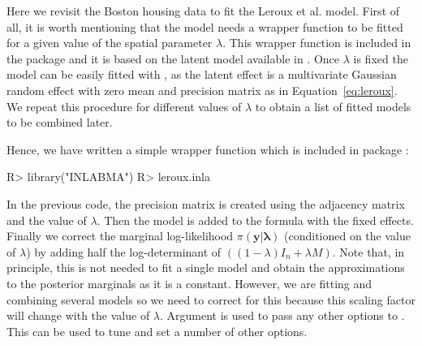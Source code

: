 \documentclass[article]{jss}
\begin{document}
Here we revisit the Boston housing data to fit the Leroux et al. model.  First
of all, it is worth mentioning that the model needs a wrapper function to be
fitted for a given value of the spatial parameter $\lambda$. This wrapper
function is included in the  package  and it is based
on the  latent model available in  .  Once $\lambda$
is fixed the model can be easily fitted with , as the latent effect
is a multivariate Gaussian random effect with zero mean and precision matrix as
in Equation~\ref{eq:leroux}.  We repeat this procedure for different values of
$\lambda$ to obtain a list of fitted models to be combined later.

Hence, we have written a simple wrapper function which is included in package :

\begin{Schunk}
\begin{Sinput}
R> library("INLABMA")
R> leroux.inla
\end{Sinput}
\end{Schunk}


In the previous code, the precision matrix  is created using the
adjacency matrix  and the value of $\lambda$. Then the 
model is added to the formula with the fixed effects. Finally we correct the
marginal log-likelihood $\pi(\mathbf{y|\lambda})$ (conditioned on the value of
$\lambda$) by adding half the log-determinant of $((1-\lambda)I_n+\lambda M)$.
Note that, in principle, this is not needed to fit a single model and obtain
the approximations to the posterior marginals as it is a constant. However, we
are fitting and combining several models so we need to correct for this because
this scaling factor will change with the value of $\lambda$.  Argument
 is used to pass any other options to .  This can be
used to tune and set a number of other options.
\end{document}
